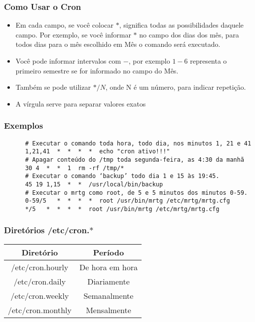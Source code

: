 \documentclass{beamer}
\begin{document}
   \begin{frame}
      \frametitle{Como Usar o Cron}
      \begin{itemize}
         \item Em cada campo, se você colocar $*$, significa todas as possibilidades daquele campo. Por exemplo, se você informar $*$ no campo dos dias dos mês, para todos dias para o mês escolhido em Mês o comando será executado. 
         \item Você pode informar intervalos com $-$, por exemplo $1-6$ representa o primeiro semestre se for informado no campo do Mês. \\
	 \item Também se pode utilizar $*/N$, onde N é um número, para indicar repetição.
	 \item A vírgula serve para separar valores exatos
      \end{itemize}
   \end{frame}


   \begin{frame}[fragile]
      \frametitle{Exemplos}
      \scriptsize
      \begin{verbatim}
      # Executar o comando toda hora, todo dia, nos minutos 1, 21 e 41
      1,21,41  *  *  *  *  echo "cron ativo!!!"
      # Apagar conteúdo do /tmp toda segunda-feira, as 4:30 da manhã
      30 4  *  *  1  rm -rf /tmp/*
      # Executar o comando ‘backup’ todo dia 1 e 15 às 19:45.
      45 19 1,15  *  *  /usr/local/bin/backup
      # Executar o mrtg como root, de 5 e 5 minutos dos minutos 0-59. 
      0-59/5   *  *  *  *  root /usr/bin/mrtg /etc/mrtg/mrtg.cfg
      */5   *  *  *  *  root /usr/bin/mrtg /etc/mrtg/mrtg.cfg
      \end{verbatim}
\end{frame}

   \begin{frame}
      \frametitle{Diretórios /etc/cron.$*$}
      \begin{table}
         \begin{tabular}{c|c}
         Diretório & Período \\
         \hline 
	 /etc/cron.hourly & De hora em hora \\
	 /etc/cron.daily  & Diariamente \\
	 /etc/cron.weekly & Semanalmente \\
	 /etc/cron.monthly & Mensalmente \\ 
         \end{tabular}
      \end{table}
   \end{frame}
\end{document}
